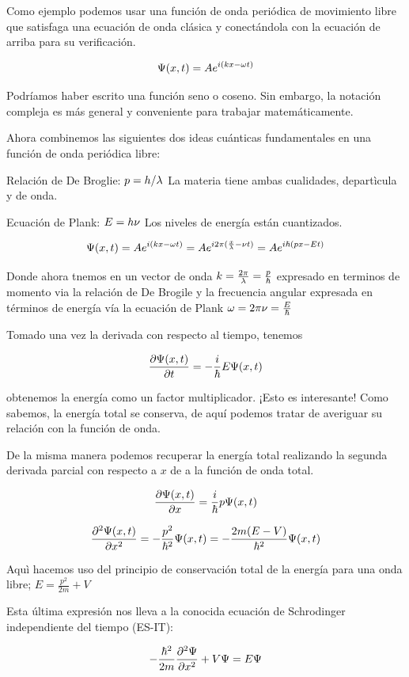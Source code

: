 \documentclass[11pt]{article}
\begin{document}
Como ejemplo podemos usar una función de onda periódica de movimiento
libre que satisfaga una ecuación de onda clásica y conectándola con la
ecuación de arriba para su verificación.

\[\large \Psi(x,t)=Ae^{i(kx-\omega t)}\]

Podríamos haber escrito una función seno o coseno. Sin embargo, la
notación compleja es más general y conveniente para trabajar
matemáticamente.

Ahora combinemos las siguientes dos ideas cuánticas fundamentales en una
función de onda periódica libre:

Relación de De Broglie: \(\large p=h/\lambda\) La materia tiene ambas
cualidades, departìcula y de onda.

Ecuación de Plank: \(\large E=h\nu\) Los niveles de energía están
cuantizados.

\[\large \Psi(x,t)=Ae^{i(kx-\omega t)}=Ae^{i2\pi(\frac{x}{\lambda}-\nu t)}= Ae^{i\hbar(px-E t)}\]

Donde ahora tnemos en un vector de onda
\(\large k=\frac{2\pi}{\lambda}=\frac{p}{\hbar}\) expresado en terminos
de momento via la relación de De Brogile y la frecuencia angular
expresada en términos de energía vía la ecuación de Plank
\(\large \omega=2\pi \nu=\frac{E}{\hbar}\)

Tomado una vez la derivada con respecto al tiempo, tenemos

\[\large \frac{\partial \Psi(x,t)}{\partial t}=-\frac{i}{\hbar}E \Psi(x,t)\]

obtenemos la energía como un factor multiplicador. ¡Esto es interesante!
Como sabemos, la energía total se conserva, de aquí podemos tratar de
averiguar su relación con la función de onda.

De la misma manera podemos recuperar la energía total realizando la
segunda derivada parcial con respecto a \(x\) de a la función de onda
total.

\[\large \frac{\partial \Psi(x,t)}{\partial x}=\frac{i}{\hbar}p\Psi(x,t)\]

\[\large \frac{\partial^2 \Psi(x,t)}{\partial x^2}=-\frac{p^2}{\hbar^2}\Psi(x,t)=-\frac{2m(E-V)}{\hbar^2}\Psi(x,t)\]

Aquì hacemos uso del principio de conservación total de la energía para
una onda libre; \(E=\frac{p^2}{2m}+V\)

Esta última expresión nos lleva a la conocida ecuación de Schrodinger
independiente del tiempo (ES-IT):

\[\large -\frac{\hbar^2}{2m}\frac{\partial^2 \Psi}{\partial x^2}+V\Psi=E\Psi \]
\end{document}
